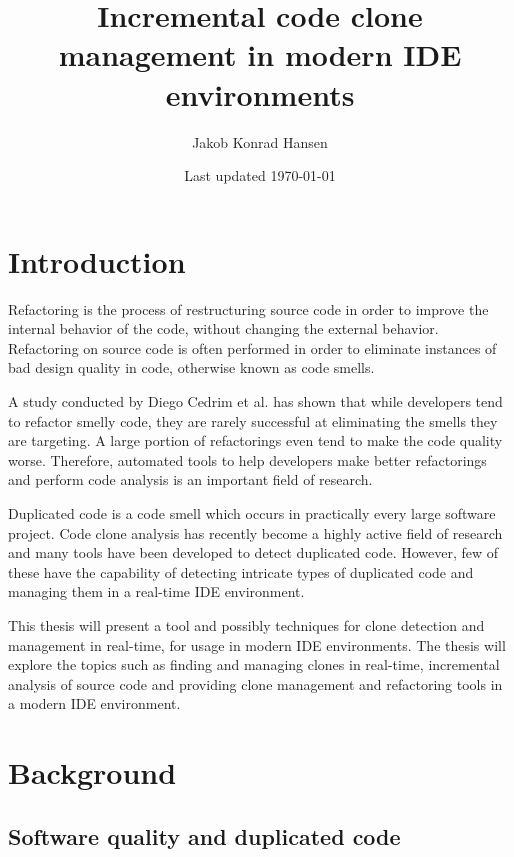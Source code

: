 \documentclass[12pt]{article}
\title{\vspace{-20px}Incremental code clone management in modern IDE environments}
\author{Jakob Konrad Hansen}
\date{Last updated \today}
\begin{document}
\maketitle


\tableofcontents

\newpage

\section{Introduction}

Refactoring is the process of restructuring source code in order to improve the internal behavior
of the code, without changing the external behavior\cite[9]{fowlerrefactoring}.
Refactoring on source code is often performed in order to eliminate instances of bad
design quality in code, otherwise known as code smells.

A study conducted by Diego Cedrim et al. has shown that while developers tend to refactor
smelly code, they are rarely successful at eliminating the smells they are
targeting\cite{Rohit_Gheyi_Impact}. A large portion of refactorings even tend to make the
code quality worse. Therefore, automated tools to help developers make better refactorings
and perform code analysis is an important field of research.

Duplicated code is a code smell which occurs in practically every large software project.
Code clone analysis has recently become a highly active field of research and many tools
have been developed to detect duplicated code\cite[7]{Inoue_introduction_to_cc}. However,
few of these have the capability of detecting intricate types of duplicated code and
managing them in a real-time IDE environment.

This thesis will present a tool and possibly techniques for clone detection and management
in real-time, for usage in modern IDE environments. The thesis will explore the topics
such as finding and managing clones in real-time, incremental analysis of source code and
providing clone management and refactoring tools in a modern IDE environment.

\section{Background}

\subsection{Software quality and duplicated code}
\end{document}
